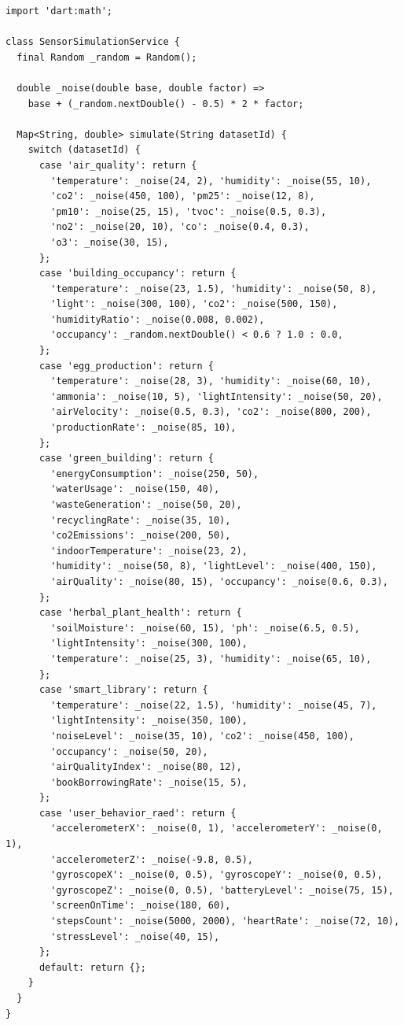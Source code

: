 \documentclass[12pt,a4paper,oneside]{report}
\begin{document}
\begin{lstlisting}[style=dartstyle]
import 'dart:math';

class SensorSimulationService {
  final Random _random = Random();

  double _noise(double base, double factor) =>
    base + (_random.nextDouble() - 0.5) * 2 * factor;

  Map<String, double> simulate(String datasetId) {
    switch (datasetId) {
      case 'air_quality': return {
        'temperature': _noise(24, 2), 'humidity': _noise(55, 10),
        'co2': _noise(450, 100), 'pm25': _noise(12, 8),
        'pm10': _noise(25, 15), 'tvoc': _noise(0.5, 0.3),
        'no2': _noise(20, 10), 'co': _noise(0.4, 0.3),
        'o3': _noise(30, 15),
      };
      case 'building_occupancy': return {
        'temperature': _noise(23, 1.5), 'humidity': _noise(50, 8),
        'light': _noise(300, 100), 'co2': _noise(500, 150),
        'humidityRatio': _noise(0.008, 0.002),
        'occupancy': _random.nextDouble() < 0.6 ? 1.0 : 0.0,
      };
      case 'egg_production': return {
        'temperature': _noise(28, 3), 'humidity': _noise(60, 10),
        'ammonia': _noise(10, 5), 'lightIntensity': _noise(50, 20),
        'airVelocity': _noise(0.5, 0.3), 'co2': _noise(800, 200),
        'productionRate': _noise(85, 10),
      };
      case 'green_building': return {
        'energyConsumption': _noise(250, 50),
        'waterUsage': _noise(150, 40),
        'wasteGeneration': _noise(50, 20),
        'recyclingRate': _noise(35, 10),
        'co2Emissions': _noise(200, 50),
        'indoorTemperature': _noise(23, 2),
        'humidity': _noise(50, 8), 'lightLevel': _noise(400, 150),
        'airQuality': _noise(80, 15), 'occupancy': _noise(0.6, 0.3),
      };
      case 'herbal_plant_health': return {
        'soilMoisture': _noise(60, 15), 'ph': _noise(6.5, 0.5),
        'lightIntensity': _noise(300, 100),
        'temperature': _noise(25, 3), 'humidity': _noise(65, 10),
      };
      case 'smart_library': return {
        'temperature': _noise(22, 1.5), 'humidity': _noise(45, 7),
        'lightIntensity': _noise(350, 100),
        'noiseLevel': _noise(35, 10), 'co2': _noise(450, 100),
        'occupancy': _noise(50, 20),
        'airQualityIndex': _noise(80, 12),
        'bookBorrowingRate': _noise(15, 5),
      };
      case 'user_behavior_raed': return {
        'accelerometerX': _noise(0, 1), 'accelerometerY': _noise(0, 1),
        'accelerometerZ': _noise(-9.8, 0.5),
        'gyroscopeX': _noise(0, 0.5), 'gyroscopeY': _noise(0, 0.5),
        'gyroscopeZ': _noise(0, 0.5), 'batteryLevel': _noise(75, 15),
        'screenOnTime': _noise(180, 60),
        'stepsCount': _noise(5000, 2000), 'heartRate': _noise(72, 10),
        'stressLevel': _noise(40, 15),
      };
      default: return {};
    }
  }
}
\end{lstlisting}
\end{document}
